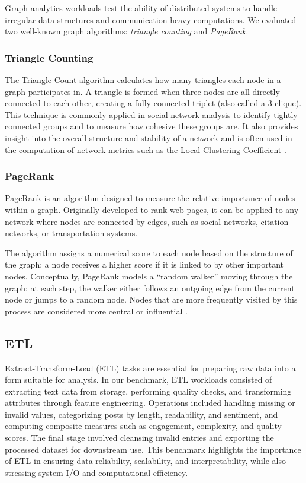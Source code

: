 \documentclass[conference]{IEEEtran}
\begin{document}
Graph analytics workloads test the ability of distributed systems to handle
irregular data structures and communication-heavy computations. We evaluated
two well-known graph algorithms: \textit{triangle counting} and
\textit{PageRank}.

\subsubsection{Triangle Counting}
The Triangle Count algorithm calculates how many triangles each node in a
graph participates in. A triangle is formed when three nodes are all
directly connected to each other, creating a fully connected triplet (also
called a 3-clique). This technique is commonly applied in social network
analysis to identify tightly connected groups and to measure how cohesive
these groups are. It also provides insight into the overall structure and
stability of a network and is often used in the computation of network
metrics such as the Local Clustering Coefficient \cite{triangles}.

\subsubsection{PageRank}
PageRank is an algorithm designed to measure the relative importance of nodes
within a graph. Originally developed to rank web pages, it can be applied to
any network where nodes are connected by edges, such as social networks,
citation networks, or transportation systems.

The algorithm assigns a numerical score to each node based on the structure
of the graph: a node receives a higher score if it is linked to by other
important nodes. Conceptually, PageRank models a “random walker” moving
through the graph: at each step, the walker either follows an outgoing edge
from the current node or jumps to a random node. Nodes that are more
frequently visited by this process are considered more central or influential
\cite{pagerank}.

\subsection{ETL}

Extract-Transform-Load (ETL) tasks are essential for preparing raw
data into a form suitable for analysis. In our benchmark, ETL
workloads consisted of extracting text data from storage, performing
quality checks, and transforming attributes through feature
engineering. Operations included handling missing or invalid values,
categorizing posts by length, readability, and sentiment, and
computing composite measures such as engagement, complexity, and
quality scores. The final stage involved cleansing invalid entries
and exporting the processed dataset for downstream use. This
benchmark highlights the importance of ETL in ensuring data
reliability, scalability, and interpretability, while also
stressing system I/O and computational efficiency.
\end{document}
